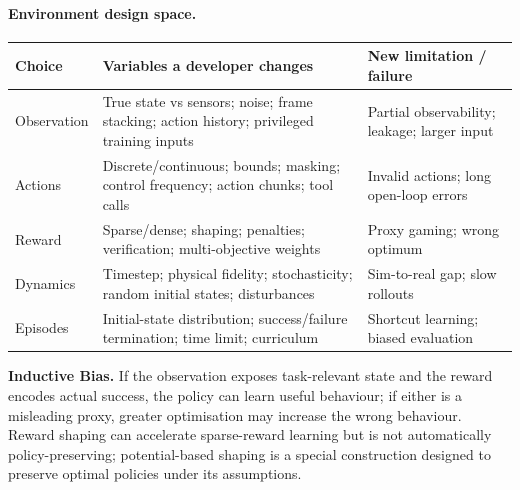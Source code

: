 \paragraph{Environment design space.}
\begin{center}\begingroup\footnotesize\setlength{\tabcolsep}{3pt}
\begin{tabular}{|p{.19\linewidth}|p{.44\linewidth}|p{.28\linewidth}|}\hline
\textbf{Choice} & \textbf{Variables a developer changes} & \textbf{New limitation / failure}\\ \hline
Observation & True state vs sensors; noise; frame stacking; action history; privileged training inputs & Partial observability; leakage; larger input \\ \hline
Actions & Discrete/continuous; bounds; masking; control frequency; action chunks; tool calls & Invalid actions; long open-loop errors \\ \hline
Reward & Sparse/dense; shaping; penalties; verification; multi-objective weights & Proxy gaming; wrong optimum \\ \hline
Dynamics & Timestep; physical fidelity; stochasticity; random initial states; disturbances & Sim-to-real gap; slow rollouts \\ \hline
Episodes & Initial-state distribution; success/failure termination; time limit; curriculum & Shortcut learning; biased evaluation \\ \hline
\end{tabular}\endgroup\end{center}
\textbf{Inductive Bias.} If the observation exposes task-relevant state and the reward encodes actual success, the policy can learn useful behaviour; if either is a misleading proxy, greater optimisation may increase the wrong behaviour.
Reward shaping can accelerate sparse-reward learning but is not automatically policy-preserving; potential-based shaping is a special construction designed to preserve optimal policies under its assumptions.

